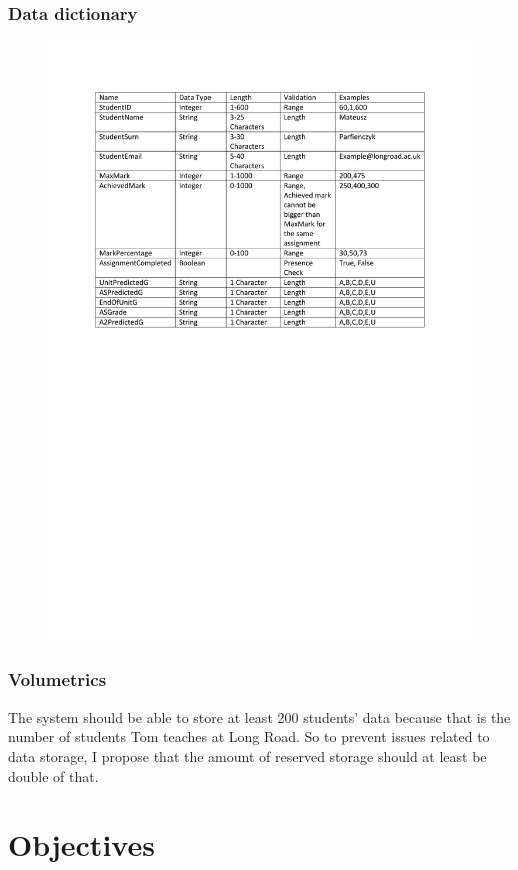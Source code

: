\subsubsection{Data dictionary}
\begin{figure}[H]
    \includegraphics[width=\textwidth]{./Analysis/images/DataDictionary.pdf}
\end{figure}

\subsubsection{Volumetrics}
The system should be able to store at least 200 students' data because that is the number of students Tom teaches at Long Road. 
So to prevent issues related to data storage, I propose that the amount of reserved storage should at least be double of that.

\section{Objectives}
